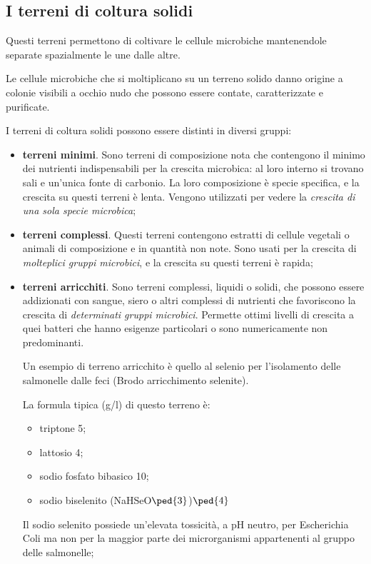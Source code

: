 \documentclass[11pt]{book}
\begin{document}
\subsection{I terreni di coltura solidi}
Questi terreni permettono di coltivare le cellule microbiche mantenendole separate spazialmente le une dalle altre.

Le cellule microbiche che si moltiplicano su un terreno solido danno origine a colonie visibili a occhio nudo che possono essere contate, caratterizzate e purificate.

I terreni di coltura solidi possono essere distinti in diversi gruppi:
\begin{itemize}
\item \textbf{terreni minimi}. Sono terreni di composizione nota che contengono il minimo dei nutrienti indispensabili per la crescita microbica: al loro interno si trovano sali e un'unica fonte di carbonio. La loro composizione è specie specifica, e la crescita su questi terreni è lenta. Vengono utilizzati per vedere la \emph{crescita di una sola specie microbica};
\item \textbf{terreni complessi}. Questi terreni contengono estratti di cellule vegetali o animali di composizione e in quantità non note. Sono usati per la crescita di \emph{molteplici gruppi microbici}, e la crescita su questi terreni è rapida;
\item \textbf{terreni arricchiti}. Sono terreni complessi, liquidi o solidi, che possono essere addizionati con sangue, siero o altri complessi di nutrienti che favoriscono la crescita di \emph{determinati gruppi microbici}. Permette ottimi livelli di crescita a quei batteri che hanno esigenze particolari o sono numericamente non predominanti.

Un esempio di terreno arricchito è quello al selenio per l’isolamento delle salmonelle dalle feci (Brodo arricchimento selenite).

La formula tipica (g/l) di questo terreno è:
\begin{itemize}
\item triptone 5;
\item lattosio 4;
\item sodio fosfato bibasico 10;
\item sodio biselenito (NaHSeO$\ped{3}$)$\ped{4}$
\end{itemize}

Il sodio selenito possiede un'elevata tossicità, a pH neutro, per Escherichia Coli ma non per la maggior parte dei microrganismi appartenenti al gruppo delle salmonelle;


\end{itemize}
\end{document}
